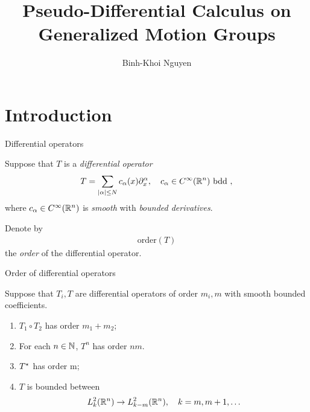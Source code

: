 \documentclass{beamer}
\title{Pseudo-Differential Calculus on Generalized Motion Groups}
\author{Binh-Khoi Nguyen}
\begin{document}
\maketitle

\section{Introduction}

\renewcommand \Group {\R^n}

\begin{frame}
    {Differential operators}

    Suppose that $T$ is a \emph{differential operator}
    \begin{align*}
        T =
        \sum_{\abs \alpha \leq N}
        c_\alpha(x)
        \iD {x^\alpha},
        \quad
        c_\alpha \in \SmoothFunctions {\R^n}
        \text{ bdd },
    \end{align*}
    where $c_\alpha \in {C^\infty(\mathbb{R}^n)}$ is \emph{smooth} with \emph{bounded derivatives}.

    \pause

    Denote by
    \begin{align*}
        \mathrm{order}(T)
    \end{align*}
    the \emph{order} of the differential operator.
\end{frame}

\begin{frame}
    {Order of differential operators}

    Suppose that $T_i, T$ are differential operators
    of order $m_i, m$
    with smooth bounded coefficients.

    \begin{enumerate}
        \item $T_1 \circ T_2$ has order $m_1 + m_2$;
            \pause
        \item For each $n \in \mathbb{N}$, $T^n$ has order $n m$.
            \pause
        \item ${T}^\star$ has order m;
            \pause
        \item $T$ is bounded between
            \begin{align*}
                \Sobolev k \to \Sobolev {k - m},
                \quad k = m, m + 1, \dots
            \end{align*}
    \end{enumerate}
\end{frame}
\end{document}
